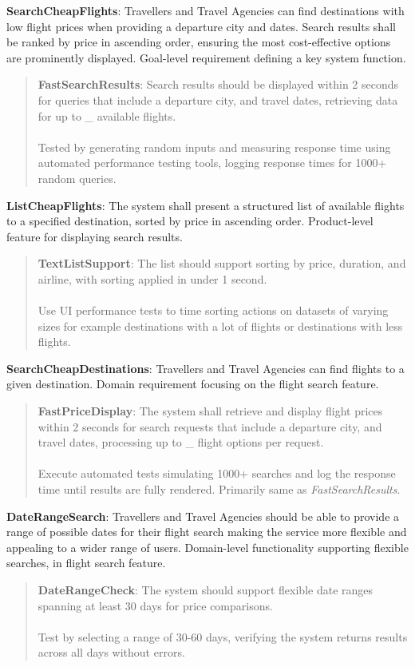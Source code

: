 \textbf{SearchCheapFlights}: Travellers and Travel Agencies can find destinations with low flight prices when providing a departure city and dates. Search results shall be ranked by price in ascending order, ensuring the most cost-effective options are prominently displayed. Goal-level requirement defining a key system function.
\begin{quote}
    \textbf{FastSearchResults}: Search results should be displayed within 2 seconds for queries that include a departure city, and travel dates, retrieving data for up to \_ available flights.\\ \\ 
    Tested by generating random inputs and measuring response time using automated performance testing tools, logging response times for 1000+ random queries.
\end{quote}
\textbf{ListCheapFlights}: The system shall present a structured list of available flights to a specified destination, sorted by price in ascending order. Product-level feature for displaying search results.
\begin{quote}
    \textbf{TextListSupport}: The list should support sorting by price, duration, and airline, with sorting applied in under 1 second.\\ \\ 
    Use UI performance tests to time sorting actions on datasets of varying sizes for example destinations with a lot of flights or destinations with less flights.
\end{quote}
\textbf{SearchCheapDestinations}: Travellers and Travel Agencies can find flights to a given destination. Domain requirement focusing on the flight search feature.
\begin{quote}
    \textbf{FastPriceDisplay}: The system shall retrieve and display flight prices within 2 seconds for search requests that include a departure city, and travel dates, processing up to \_ flight options per request.\\ \\
    Execute automated tests simulating 1000+ searches and log the response time until results are fully rendered. Primarily same as \textit{FastSearchResults}.
\end{quote}
\textbf{DateRangeSearch}: Travellers and Travel Agencies should be able to provide a range of possible dates for their flight search making the service more flexible and appealing to a wider range of users. Domain-level functionality supporting flexible searches, in flight search feature.
\begin{quote}
    \textbf{DateRangeCheck}: The system should support flexible date ranges spanning at least 30 days for price comparisons. \\ \\
    Test by selecting a range of 30-60 days, verifying the system returns results across all days without errors.
\end{quote}
